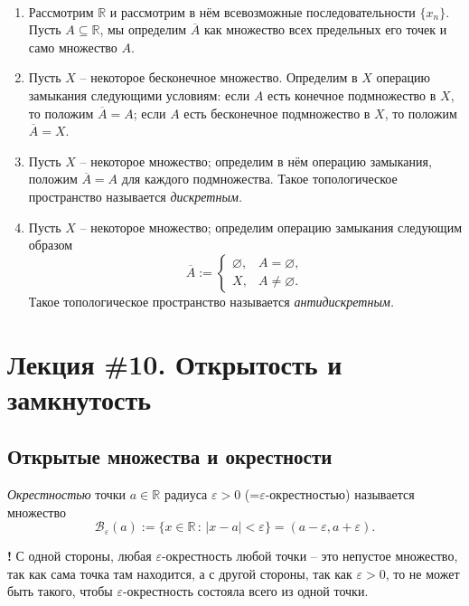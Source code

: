 \begin{example}~
    \begin{enumerate}
        \item Рассмотрим $\mathbb{R}$ и рассмотрим в нём всевозможные последовательности $\{x_n\}$. Пусть $A \subseteq \mathbb{R}$, мы определим $\overline{A}$ как множество всех предельных его точек и само множество $A$.
        \item Пусть $X$ -- некоторое бесконечное множество. Определим в $X$ операцию замыкания следующими условиям: если $A$ есть конечное подмножество в $X$, то положим $\overline{A} = A$; если $A$ есть бесконечное подмножество в $X$, то положим $\overline{A} = X$. 
        \item Пусть $X$ -- некоторое множество; определим в нём операцию замыкания, положим $\overline{A} = A$ для каждого подмножества. Такое топологическое пространство называется \textit{дискретным.}
        \item Пусть $X$ -- некоторое множество; определим операцию замыкания следующим образом
        \[
         \overline{A} := \begin{cases}
             \varnothing, & A = \varnothing,\\
             X, & A \ne \varnothing.
         \end{cases}
        \]
        Такое топологическое пространство называется \textit{антидискретным.}
    \end{enumerate}
\end{example}


\section{Лекция \#10. Открытость и замкнутость}

\subsection{Открытые множества и окрестности}

\begin{definition}
    \textit{Окрестностью} точки $a \in \mathbb{R}$ радиуса $\varepsilon>0$ (=$\varepsilon$-окрестностью) называется множество
    \[
     \mathscr{B}_\varepsilon(a):=\{x\in \mathbb{R}\, :\, |x-a| < \varepsilon\} = (a-\varepsilon, a+\varepsilon).
    \]
\end{definition}

\begin{mydanger}{\bf !}
 С одной стороны, любая $\varepsilon$-окрестность любой точки -- это непустое множество, так как сама точка там находится, а с другой стороны, так как $\varepsilon>0$, то не может быть такого, чтобы $\varepsilon$-окрестность состояла всего из одной точки.
\end{mydanger}


